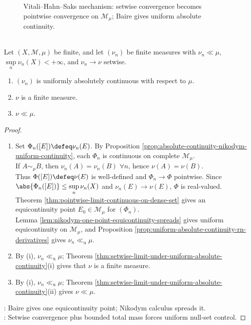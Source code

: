 \begin{figure}[H]
  \centering
  
  \caption{Vitali--Hahn--Saks mechanism: setwise convergence becomes pointwise convergence on $\mathcal{M}_\mu$; Baire gives uniform absolute continuity.}
  \label{fig:nikodym-vitali-hahn-saks-flow}
\end{figure}

\begin{theorem} \label{thm:vitali-hahn-saks-setwise-convergence} \\
Let $(X,\mathcal{M},\mu)$ be finite, and let $(\nu_n)$ be finite measures with $\nu_n\ll\mu$, $\sup\limits_n\nu_n(X)<+\infty$, and $\nu_n\to\nu$ setwise.
\begin{enumerate}[label=(\roman*)]
\setlength{\itemsep}{0pt}
\item $(\nu_n)$ is uniformly absolutely continuous with respect to $\mu$.
\item $\nu$ is a finite measure.
\item $\nu\ll\mu$.
\end{enumerate}
\begin{proof}
\begin{enumerate}[label=(\roman*)]
\setlength{\itemsep}{0pt}
\item Set $\Phi_n([E])\defeq\nu_n(E)$. By Proposition \ref{prop:absolute-continuity-nikodym-uniform-continuity}, each $\Phi_n$ is continuous on complete $\mathcal{M}_\mu$.\\
If $A\sim_\mu B$, then $\nu_n(A)=\nu_n(B)$ $\forall n$, hence $\nu(A)=\nu(B)$.\\
Thus $\Phi([E])\defeq\nu(E)$ is well-defined and $\Phi_n\to\Phi$ pointwise. Since $\abs{\Phi_n([E])}\leq\sup\limits_n\nu_n(X)$ and $\nu_n(E)\to\nu(E)$, $\Phi$ is real-valued.\\
Theorem \ref{thm:pointwise-limit-continuous-on-dense-set} gives an equicontinuity point $E_0\in\mathcal{M}_\mu$ for $(\Phi_n)$.\\
Lemma \ref{lem:nikodym-one-point-equicontinuity-spreads} gives uniform equicontinuity on $\mathcal{M}_\mu$, and Proposition \ref{prop:uniform-absolute-continuity-rn-derivatives} gives $\nu_n\ll_{\mathrm{u}}\mu$.
\item By (i), $\nu_n\ll_{\mathrm{u}}\mu$; Theorem \ref{thm:setwise-limit-under-uniform-absolute-continuity}(i) gives that $\nu$ is a finite measure.
\item By (i), $\nu_n\ll_{\mathrm{u}}\mu$; Theorem \ref{thm:setwise-limit-under-uniform-absolute-continuity}(ii) gives $\nu\ll\mu$.
\end{enumerate}
: Baire gives one equicontinuity point; Nikodym calculus spreads it.\\
: Setwise convergence plus bounded total mass forces uniform null-set control.
\end{proof}
\end{theorem}

